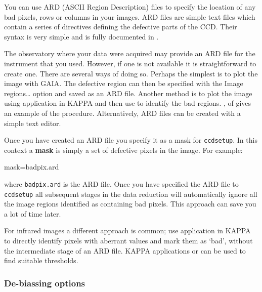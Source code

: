 \documentclass[twoside,11pt]{starlink}
\begin{document}
You can use ARD (ASCII Region Description) files to specify the location
of any bad pixels, rows or columns in your images.  ARD files are simple
text files which contain a series of directives defining the defective
parts of the CCD.  Their syntax is very simple and is fully documented
in \/\cite{SUN183}.

The observatory where your data were acquired may provide an ARD file for
the instrument that you used.  However, if one is not available it is
straightforward to create one.  There are several ways of doing so.
Perhaps the simplest is to plot the image with GAIA.  The defective region
can then be specified with the \textsf{Image regions\ldots} option and saved
as an ARD file.  Another method is to plot the image using application
 in KAPPA and then use
 to identify the bad regions.
, of
 gives an example of the procedure.  Alternatively,
ARD files can be created with a simple text editor.

Once you have created an ARD file you specify it as a mask for \texttt{ccdsetup}.  In this context a \textbf{mask} is simply a set of defective
pixels in the image.  For example:

\begin{terminalv}
    mask=badpix.ard
\end{terminalv}

where \texttt{badpix.ard} is the ARD file.  Once you have specified the
ARD file to \texttt{ccdsetup} all subsequent stages in the data reduction
will automatically ignore all the image regions identified as containing
bad pixels.  This approach can save you a lot of time later.

For infrared images a different approach is common; use application
 in KAPPA to directly identify
pixels with aberrant values and mark them as `bad', without the
intermediate stage of an ARD file.  KAPPA applications
 or 
can be used to find suitable thresholds.

\subsubsection{De-biassing options}
\end{document}
